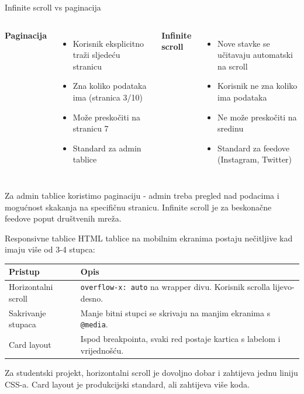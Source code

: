 \begin{frame}{Infinite scroll vs paginacija}
\begin{columns}[T]
\textbf{Paginacija}
\begin{itemize}
  \item Korisnik eksplicitno traži sljedeću stranicu
  \item Zna koliko podataka ima (stranica 3/10)
  \item Može preskočiti na stranicu 7
  \item Standard za admin tablice
\end{itemize}

\textbf{Infinite scroll}
\begin{itemize}
  \item Nove stavke se učitavaju automatski na scroll
  \item Korisnik ne zna koliko ima podataka
  \item Ne može preskočiti na sredinu
  \item Standard za feedove (Instagram, Twitter)
\end{itemize}
\end{columns}

\vspace{0.6em}
Za admin tablice koristimo paginaciju - admin treba pregled nad podacima i mogućnost skakanja na specifičnu stranicu. Infinite scroll je za beskonačne feedove poput društvenih mreža.
\end{frame}

\begin{frame}{Responsivne tablice}
HTML tablice na mobilnim ekranima postaju nečitljive kad imaju više od 3-4 stupca:

\vspace{0.4em}
\begin{tabular}{@{}lp{8cm}@{}}
  \toprule
  \textbf{Pristup} & \textbf{Opis} \\
  \midrule
  Horizontalni scroll & \texttt{overflow-x: auto} na wrapper divu. Korisnik scrolla lijevo-desno. \\
  Sakrivanje stupaca & Manje bitni stupci se skrivaju na manjim ekranima s \texttt{@media}. \\
  Card layout & Ispod breakpointa, svaki red postaje kartica s labelom i vrijednošću. \\
  \bottomrule
\end{tabular}

\vspace{0.6em}
Za studentski projekt, horizontalni scroll je dovoljno dobar i zahtijeva jednu liniju CSS-a. Card layout je produkcijski standard, ali zahtijeva više koda.
\end{frame}

